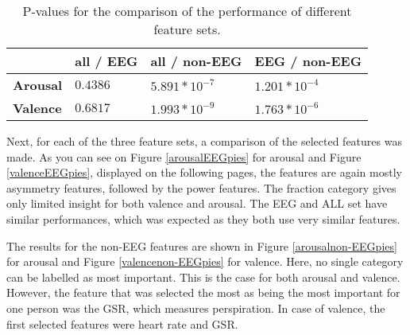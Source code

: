 \begin{table}[H]
\centering
\caption{P-values for the comparison of the performance of different feature sets.\label{pvals}}
\begin{tabular}{l|lll}
	    		 & \textbf{all / EEG} & \textbf{all / non-EEG} & \textbf{EEG / non-EEG} \\ \hline
\textbf{Arousal} & $0.4386$          & $5.891 * 10^{-7}$  & $1.201 * 10^{-4}$ \\
\textbf{Valence} & $0.6817$          & $1.993 * 10^{-9}$  & $1.763 * 10^{-6}$                 
\end{tabular}
\end{table}
\clearpage

Next, for each of the three feature sets, a comparison of the selected features was made. As you can see on Figure \ref{arousalEEGpies} for arousal and Figure \ref{valenceEEGpies}, displayed on the following pages, the features are again mostly asymmetry features, followed by the power features. The fraction category gives only limited insight for both valence and arousal. The EEG and ALL set have similar performances, which was expected as they both use very similar features.

\npar

The results for the non-EEG features are shown in Figure \ref{arousalnon-EEGpies} for arousal and Figure \ref{valencenon-EEGpies} for valence.
Here, no single category can be labelled as most important. This is the case for both arousal and valence. However, the feature that was selected the most as being the most important for one person was the GSR, which measures perspiration. In case of valence, the first selected features were heart rate and GSR.

